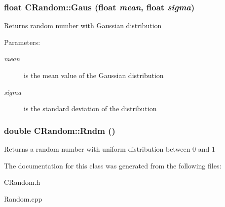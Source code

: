 \subsubsection{\setlength{\rightskip}{0pt plus 5cm}float CRandom::Gaus (float {\em mean}, float {\em sigma})\hspace{0.3cm}{\tt  [static]}}\label{classCRandom_2ef2778f16be94f6d402949f05ee1318}


Returns random number with Gaussian distribution \begin{Desc}
\item[Parameters:]
\begin{description}
\item[{\em mean}]is the mean value of the Gaussian distribution \item[{\em sigma}]is the standard deviation of the distribution \end{description}
\end{Desc}
\subsubsection{\setlength{\rightskip}{0pt plus 5cm}double CRandom::Rndm ()\hspace{0.3cm}{\tt  [static]}}\label{classCRandom_d076a768bd120ebd05b71afe729692b9}


Returns a random number with uniform distribution between 0 and 1 

The documentation for this class was generated from the following files:\begin{CompactItemize}
\item 
CRandom.h\item 
Random.cpp\end{CompactItemize}
